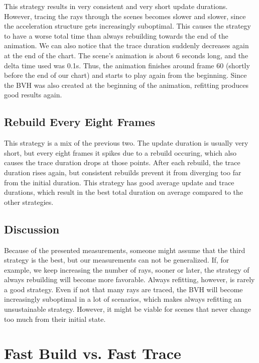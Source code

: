 This strategy results in very consistent and very short update durations. However, tracing the rays through the scenes becomes slower and slower, since the acceleration structure gets increasingly suboptimal. This causes the strategy to have a worse total time than always rebuilding towards the end of the animation. We can also notice that the trace duration suddenly decreases again at the end of the chart. The scene's animation is about 6 seconds long, and the delta time used was 0.1s. Thus, the animation finishes around frame 60 (shortly before the end of our chart) and starts to play again from the beginning. Since the BVH was also created at the beginning of the animation, refitting produces good results again.

\subsection{Rebuild Every Eight Frames}

This strategy is a mix of the previous two. The update duration is usually very short, but every eight frames it spikes due to a rebuild occuring, which also causes the trace duration drops at those points. After each rebuild, the trace duration rises again, but consistent rebuilds prevent it from diverging too far from the initial duration. This strategy has good average update and trace durations, which result in the best total duration on average compared to the other strategies.

\subsection{Discussion}

Because of the presented measurements, someone might assume that the third strategy is the best, but our measurements can not be generalized. If, for example, we keep increasing the number of rays, sooner or later, the strategy of always rebuilding will become more favorable. Always refitting, however, is rarely a good strategy. Even if not that many rays are traced, the BVH will become increasingly suboptimal in a lot of scenarios, which makes always refitting an unsustainable strategy. However, it might be viable for scenes that never change too much from their initial state.

\section{Fast Build vs. Fast Trace}

